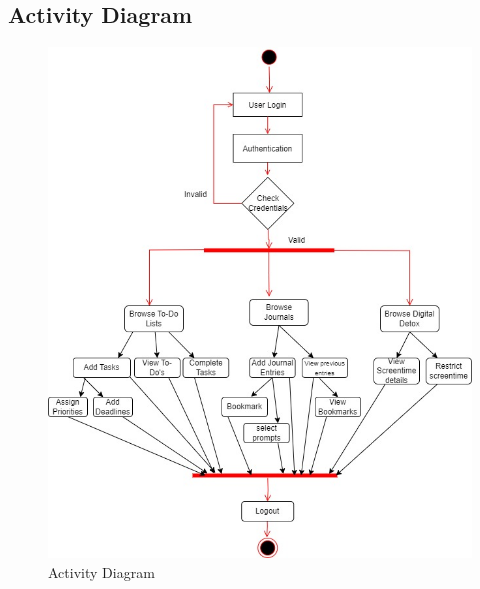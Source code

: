 \subsection{Activity Diagram}
\begin{figure}[hbt!]
    \centering
    \includegraphics[width=150mm]{Activity.jpg}
    \caption{Activity Diagram}
    \label{fig:Activity Diagram }
\end{figure}

\newpage
